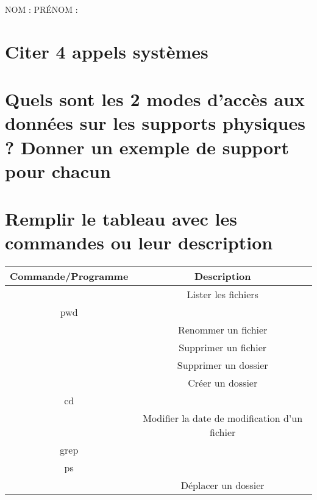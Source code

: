 \documentclass[11pt,a4paper]{article}
\author{Fabrice BOISSIER}
\begin{document}
\setlength{\fboxrule}{2pt}

\noindent {}

\bigskip

NOM : \hspace{6.5cm} PR\'ENOM :

\smallskip

\section{Citer 4 appels systèmes}

\bigskip
\bigskip

\section{Quels sont les 2 modes d'accès aux données sur les supports physiques ? Donner un exemple de support pour chacun}

\bigskip
\bigskip
\bigskip
\bigskip
\bigskip

\section{Remplir le tableau avec les commandes ou leur description}

\renewcommand\arraystretch{2.5}

\bigskip
\begin{center}
  \begin{tabular}{| c | c |}
  \hline
  \textbf{Commande/Programme} & \textbf{Description} \\ \hline
  & Lister les fichiers \\ \hline
  pwd &  \\ \hline
  & Renommer un fichier \\ \hline
  & Supprimer un fichier \\ \hline
  & Supprimer un dossier \\ \hline
  & Créer un dossier \\ \hline
  cd & \\ \hline
  & Modifier la date de modification d'un fichier \\ \hline
  grep & \\ \hline
  ps & \\ \hline
  & Déplacer un dossier \\
  \hline
  \end{tabular}
\end{center}
\bigskip
\end{document}
